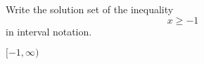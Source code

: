 
Write the solution set of the inequality
\[x\geq -1\]
in interval notation.

\begin{solution}
$[-1, \infty)$
\end{solution}

